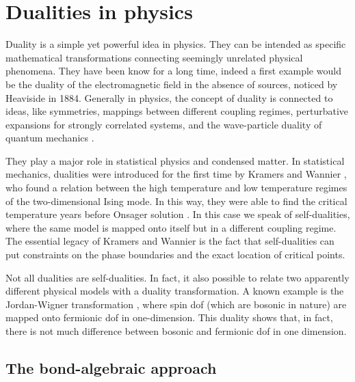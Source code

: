 \section{Dualities in physics}%
\label{sec:dualities_in_physics}


Duality is a simple yet powerful idea in physics.
They can be intended as specific mathematical transformations connecting seemingly unrelated physical phenomena.
They have been know for a long time, indeed a first example would be the duality of the electromagnetic field in the absence of sources, noticed by Heaviside in 1884.
Generally in physics, the concept of duality is connected to ideas, like symmetries, mappings between different coupling regimes, perturbative expansions for strongly correlated systems, and the wave-particle duality of quantum mechanics \cite{savit1980duality, cobanera2011bond}.

They play a major role in statistical physics and condensed matter.
In statistical mechanics, dualities were introduced for the first time by Kramers and Wannier \cite{kramers1941statistics}, who found a relation between the high temperature and low temperature regimes of the two-dimensional Ising mode.
In this way, they were able to find the critical temperature years before Onsager solution \cite{onsager1944ising}.
In this case we speak of self-dualities, where the same model is mapped onto itself but in a different coupling regime.
The essential legacy of Kramers and Wannier is the fact that self-dualities can put constraints on the phase boundaries and the exact location of critical points.

Not all dualities are self-dualities.
In fact, it also possible to relate two apparently different physical models with a duality transformation.
A known example is the Jordan-Wigner transformation \cite{schultz1964ising, jordan1928pauli}, where spin \ac{dof} (which are bosonic in nature) are mapped onto fermionic \ac{dof} in one-dimension. %
This duality shows that, in fact, there is not much difference between bosonic and fermionic \ac{dof} in one dimension.


%
%
\subsection{The bond-algebraic approach}
\label{sub:the_bond_algebraic_approach}

